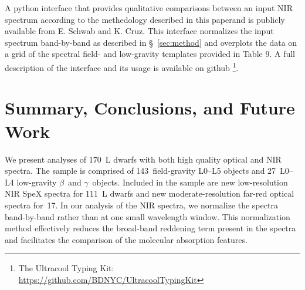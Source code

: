 \documentclass[12pt]{aastex6}
\newcommand{\sample}{170}
\newcommand{\optField}{143}
\newcommand{\optLowG}{27}
\newcommand{\NewOptObjects}{17} %
\newcommand{\NewPrismObjects}{111} %
\begin{document}


A python interface that provides qualitative comparisons between an input NIR spectrum according to the methedology described in this paperand is publicly available from E. Schwab and K. Cruz. This interface normalizes the input spectrum band-by-band as described in \S~\ref{sec:method} and overplots the data on a grid of the spectral field- and low-gravity templates provided in Table 9. A full description of the interface and its usage is available on github \footnote{The Ultracool Typing Kit: \url{https://github.com/BDNYC/UltracoolTypingKit}}.

\section{Summary, Conclusions, and Future Work}
\label{sec:summary}
We present analyses of \sample~L dwarfs with both high quality optical and NIR spectra.
The sample is comprised of \optField~field-gravity L0--L5 objects and \optLowG~L0--L4 low-gravity $\beta$~and $\gamma$~objects.
Included in the sample are new low-resolution NIR SpeX spectra for \NewPrismObjects~L dwarfs and new moderate-resolution far-red optical spectra for~\NewOptObjects.
In our analysis of the NIR spectra, we normalize the spectra band-by-band rather than at one small wavelength window.
This normalization method effectively reduces the broad-band reddening term present in the spectra and facilitates the comparison of the molecular absorption features.
\end{document}
